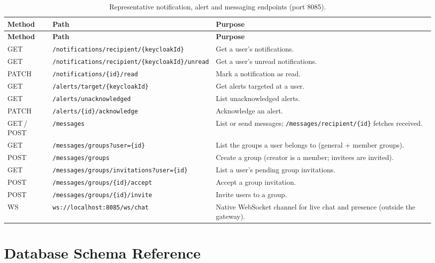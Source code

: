 \begin{longtable}{p{} p{} p{}}
\caption{Representative notification, alert and messaging endpoints (port 8085).}
\label{tab:api-notification}\\
\toprule
\textbf{Method} & \textbf{Path} & \textbf{Purpose} \\
\midrule
\endfirsthead
\toprule
\textbf{Method} & \textbf{Path} & \textbf{Purpose} \\
\midrule
\endhead
\bottomrule
\endlastfoot
GET    & \texttt{/notifications/recipient/\{keycloakId\}} & Get a user's notifications. \\
GET    & \texttt{/notifications/recipient/\{keycloakId\}/unread} & Get a user's unread notifications. \\
PATCH  & \texttt{/notifications/\{id\}/read} & Mark a notification as read. \\
GET    & \texttt{/alerts/target/\{keycloakId\}} & Get alerts targeted at a user. \\
GET    & \texttt{/alerts/unacknowledged} & List unacknowledged alerts. \\
PATCH  & \texttt{/alerts/\{id\}/acknowledge} & Acknowledge an alert. \\
GET\,/\,POST & \texttt{/messages} & List or send messages; \texttt{/messages/recipient/\{id\}} fetches received. \\
GET    & \texttt{/messages/groups?user=\{id\}} & List the groups a user belongs to (general + member groups). \\
POST   & \texttt{/messages/groups} & Create a group (creator is a member; invitees are invited). \\
GET    & \texttt{/messages/groups/invitations?user=\{id\}} & List a user's pending group invitations. \\
POST   & \texttt{/messages/groups/\{id\}/accept} & Accept a group invitation. \\
POST   & \texttt{/messages/groups/\{id\}/invite} & Invite users to a group. \\
WS     & \texttt{ws://localhost:8085/ws/chat} & Native WebSocket channel for live chat and presence (outside the gateway).~\cite{websocket} \\
\end{longtable}

\chapter{Database Schema Reference}
\label{app:schema}

